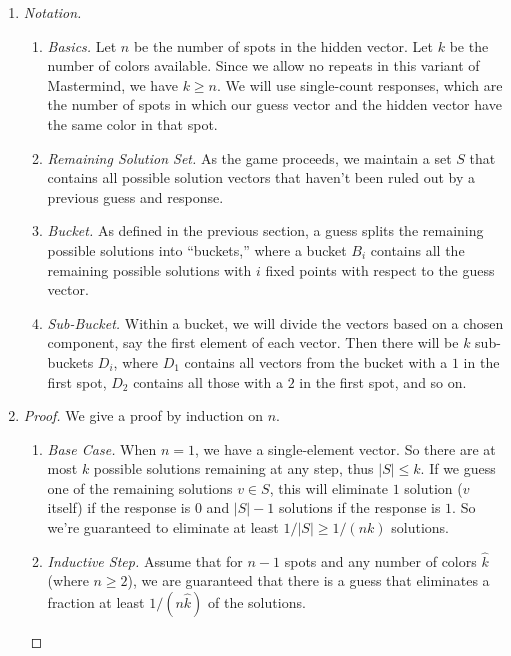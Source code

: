 \documentclass[12pt, a4paper]{article}
\begin{document}
	\begin{enumerate}
	\item\textit{Notation.}
		\begin{enumerate}[label=\roman*.]
		\item\textit{Basics.} Let $n$ be the number of spots in the hidden vector.
		Let $k$ be the number of colors available. Since we allow no repeats in this
		variant of Mastermind, we have $k\ge n$. We will use single-count responses,
		which are the number of spots in which our guess vector and the hidden vector
		have the same color in that spot.
		\item\textit{Remaining Solution Set.} As the game proceeds, we maintain a set
		$S$ that contains all possible solution vectors that haven't been ruled out
		by a previous guess and response.
		\item\textit{Bucket.} As defined in the previous section, a guess splits
		the remaining possible solutions into ``buckets,'' where a bucket $B_i$
		contains all the remaining possible solutions with $i$ fixed points with
		respect to the guess vector.
		\item\textit{Sub-Bucket.} Within a bucket, we will divide the vectors
		based on a chosen component, say the first element of each vector.
		Then there will be $k$ sub-buckets $D_i$, where $D_1$ contains all vectors
		from the bucket with a $1$ in the first spot, $D_2$ contains all those
		with a $2$ in the first spot, and so on.
		\end{enumerate}

	\item
		\begin{proof}
		We give a proof by induction on $n$.
			\begin{enumerate}[label=]
			\item\textit{Base Case.} When $n=1$, we have a single-element vector.
			So there are at most $k$ possible solutions remaining at any step, thus
			$|S|\le k$. If we guess one of the remaining solutions $v\in S$, this
			will eliminate $1$ solution ($v$ itself) if the response is $0$
			and $|S|-1$ solutions if the response is $1$. So we're guaranteed to
			eliminate at least $1/|S|\ge 1/(nk)$ solutions.
			
			\item\textit{Inductive Step.} Assume that for $n-1$ spots and any number
			of colors $\widehat{k}$ (where $n\ge 2$), we are guaranteed that
			there is a guess that eliminates a fraction at least $1/(n\widehat{k})$
			of the solutions.
			

\end{enumerate}
\end{proof}
\end{enumerate}
\end{document}
